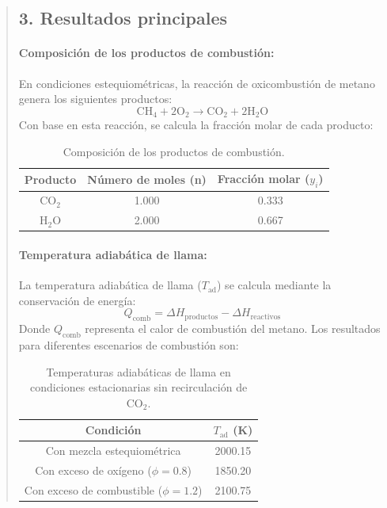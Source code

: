 \documentclass[11pt, a4paper]{article}
\begin{document}
\begin{quote}
\begin{center}
\begin{adjustwidth}{-1.7cm}{-1cm}
\subsection*{3. Resultados principales}

\paragraph{Composición de los productos de combustión:}
En condiciones estequiométricas, la reacción de oxicombustión de metano genera los siguientes productos:
\begin{equation}
\text{CH}_4 + 2\text{O}_2 \rightarrow \text{CO}_2 + 2\text{H}_2\text{O}
\end{equation}
Con base en esta reacción, se calcula la fracción molar de cada producto:

\begin{table}[H]
\centering
\begin{tabular}{|c|c|c|}
\hline
\textbf{Producto} & \textbf{Número de moles (n)} & \textbf{Fracción molar (\(y_i\))} \\ \hline
\(\text{CO}_2\)   & 1.000                        & 0.333                            \\ \hline
\(\text{H}_2\text{O}\) & 2.000                        & 0.667                            \\ \hline
\end{tabular}
\caption{Composición de los productos de combustión.}
\label{tab:composicion_productos}
\end{table}

\paragraph{Temperatura adiabática de llama:}
La temperatura adiabática de llama (\(T_{\text{ad}}\)) se calcula mediante la conservación de energía:
\begin{equation}
Q_{\text{comb}} = \Delta H_{\text{productos}} - \Delta H_{\text{reactivos}}
\end{equation}
Donde \(Q_{\text{comb}}\) representa el calor de combustión del metano. Los resultados para diferentes escenarios de combustión son:

\begin{table}[H]
\centering
\begin{tabular}{|c|c|}
\hline
\textbf{Condición} & \textbf{\(T_{\text{ad}}\) (K)} \\ \hline
Con mezcla estequiométrica & 2000.15 \\ \hline
Con exceso de oxígeno (\(\phi = 0.8\)) & 1850.20 \\ \hline
Con exceso de combustible (\(\phi = 1.2\)) & 2100.75 \\ \hline
\end{tabular}
\caption{Temperaturas adiabáticas de llama en condiciones estacionarias sin recirculación de \(\text{CO}_2\).}
\label{tab:temperatura_adiabatica}
\end{table}


\end{adjustwidth}
\end{center}
\end{quote}
\end{document}
